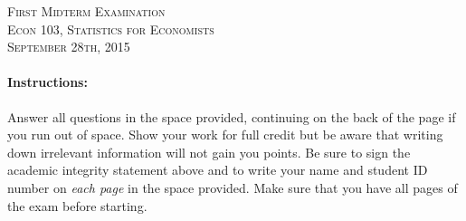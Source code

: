 \documentclass[addpoints,12pt]{exam}
\begin{document}
\begin{center}
\textsc{\large First Midterm Examination\\ \normalsize Econ 103, Statistics for Economists \\ \vspace{0.5em} September 28th, 2015}

\vspace{2em}



\end{center}


\vspace{2em}
\begin{center}
\end{center}
\vspace{0.2in}

\vspace{0.2in}

\noindent{}

\vspace{0.2in}

\noindent{}
\hfill
{}

\vspace{2em}

\begin{center}
  \gradetable[h][questions]
\end{center}

\vspace{2em}

\paragraph{Instructions:} Answer all questions in the space provided, continuing on the back of the page if you run out of space. Show your work for full credit but be aware that writing down irrelevant information will not gain you points. Be sure to sign the academic integrity statement above and to write your name and student ID number on \emph{each page} in the space provided. Make sure that you have all pages of the exam before starting.
\end{document}
